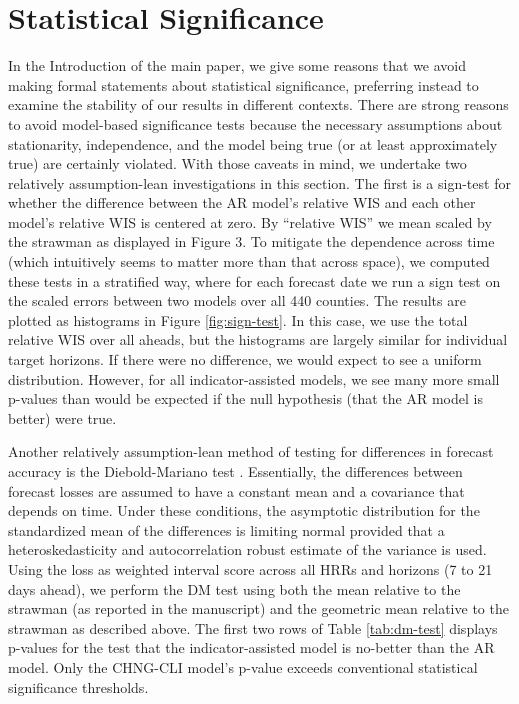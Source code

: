 \section{Statistical Significance}

In the Introduction of the main paper, we give some reasons that we avoid making
formal statements about statistical significance, preferring instead to examine
the stability of our results in different contexts. There are strong reasons to
avoid model-based significance tests because the necessary assumptions about
stationarity, independence, and the  model being true (or at least approximately
true) are certainly violated. With those caveats in mind, we undertake two
relatively assumption-lean investigations in this section. The first is a
sign-test for whether the difference between the AR model’s relative WIS  and
each other model’s relative WIS is centered at zero. By ``relative WIS'' we mean
scaled by the strawman as displayed in Figure 3. To mitigate the dependence
across time (which intuitively seems to matter more than that across space), we
computed these tests in a stratified way, where for each forecast date we run a
sign test on the scaled errors between two models over all 440 counties. The
results are plotted as histograms in Figure \ref{fig:sign-test}. In this case,
we use the total relative WIS over all aheads, but the histograms are largely
similar for individual target horizons. If there were no difference, we would
expect to see a uniform distribution. However, for all indicator-assisted
models, we see many more small p-values than would be expected if the null
hypothesis (that the AR model is better) were true.

Another relatively assumption-lean method of testing for differences in forecast
accuracy is the Diebold-Mariano test \cite{Diebold:2002, Diebold:2015,
Harvey:1997}. Essentially, the differences between forecast losses are assumed
to have a constant mean and a covariance that depends on time. Under these
conditions, the asymptotic distribution for the standardized mean of the
differences is limiting normal provided that a heteroskedasticity and
autocorrelation robust estimate of the variance is used. Using the loss as
weighted interval score across all HRRs and horizons (7 to 21 days ahead), we
perform the DM test using both the mean relative to the strawman (as reported in
the manuscript) and the geometric mean relative to the strawman as described
above. The first two rows of Table \ref{tab:dm-test} displays p-values for the
test that the indicator-assisted model is no-better than the AR model. Only the
CHNG-CLI model's p-value exceeds conventional statistical significance
thresholds.

